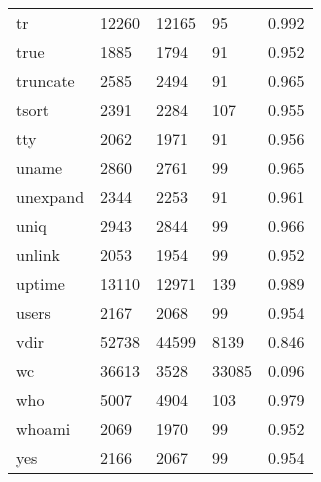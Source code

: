 \begin{longtable}{lp{4.5cm}p{4.5cm}p{4.5cm}p{4.5cm}}
tr        &                    12260 &        12165 &            95 &                    0.992 \\
true      &                     1885 &         1794 &            91 &                    0.952 \\
truncate  &                     2585 &         2494 &            91 &                    0.965 \\
tsort     &                     2391 &         2284 &           107 &                    0.955 \\
tty       &                     2062 &         1971 &            91 &                    0.956 \\
uname     &                     2860 &         2761 &            99 &                    0.965 \\
unexpand  &                     2344 &         2253 &            91 &                    0.961 \\
uniq      &                     2943 &         2844 &            99 &                    0.966 \\
unlink    &                     2053 &         1954 &            99 &                    0.952 \\
uptime    &                    13110 &        12971 &           139 &                    0.989 \\
users     &                     2167 &         2068 &            99 &                    0.954 \\
vdir      &                    52738 &        44599 &          8139 &                    0.846 \\
wc        &                    36613 &         3528 &         33085 &                    0.096 \\
who       &                     5007 &         4904 &           103 &                    0.979 \\
whoami    &                     2069 &         1970 &            99 &                    0.952 \\
yes       &                     2166 &         2067 &            99 &                    0.954 \\
\end{longtable}
